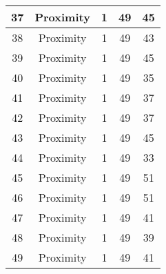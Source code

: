 \documentclass[results.tex]{subfiles}
\begin{document}
\begin{center}
\begin{tabular}{| c || c | c | c | c |}
            \hline
            37                      & Proximity                    & 1                      & 49                      & 45                   \\
            \hline
            38                      & Proximity                    & 1                      & 49                      & 43                   \\
            \hline
            39                      & Proximity                    & 1                      & 49                      & 45                   \\
            \hline
            40                      & Proximity                    & 1                      & 49                      & 35                   \\
            \hline
            41                      & Proximity                    & 1                      & 49                      & 37                   \\
            \hline
            42                      & Proximity                    & 1                      & 49                      & 37                   \\
            \hline
            43                      & Proximity                    & 1                      & 49                      & 45                   \\
            \hline
            44                      & Proximity                    & 1                      & 49                      & 33                   \\
            \hline
            45                      & Proximity                    & 1                      & 49                      & 51                   \\
            \hline
            46                      & Proximity                    & 1                      & 49                      & 51                   \\
            \hline
            47                      & Proximity                    & 1                      & 49                      & 41                   \\
            \hline
            48                      & Proximity                    & 1                      & 49                      & 39                   \\
            \hline
            49                      & Proximity                    & 1                      & 49                      & 41                   \\
            \hline
        \end{tabular}
    \end{center}
\end{document}
